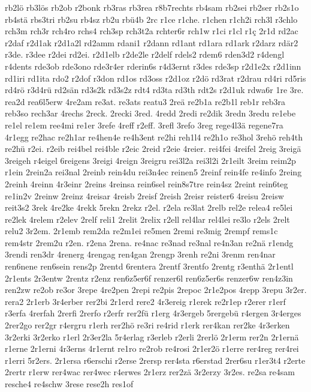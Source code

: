 {rb2lö
rb3lös
rb2ob
r2bonk
rb3ras
rb3rea
r8b7rechts
rb4sam
rb2sei
rb2ser
rb2s1o
rb4stä
rbs3tri
rb2su
rb4sz
rb2u
rbü4b
2rc
r1ce
r1che.
r1chen
r1ch2i
rch3l
r3chlo
rch3m
rch3r
rch4ro
rchs4
rch3sp
rch3t2a
rchter6r
rch1w
r1ci
r1cl
r1ç
2r1d
rd2ac
r2daf
r2d1ak
r2d1a2l
rd2amm
rdani1
r2dann
rd1ant
rd1ara
rd1ark
r2darz
rdär2
r3de.
r3dee
r2dei
rd2ei.
r2d1elb
r2de2le
r2delf
rdels2
rdem6
rden3d2
r4dengl
r4dents
rde3ob
rde3ono
rde3r4er
rderin6s
r4d3ernt
r3des
rde3sp
r2d1e2x
r2d1inn
rd1iri
rd1ita
rdo2
r2dof
r3don
rd1os
rd3oss
r2d1oz
r2dö
rd3rat
r2drau
rd4ri
rd5ris
rd4rö
r3d4rü
rd2sän
rd3s2k
rd3s2z
rdt4
rd3ta
rd3th
rdt2s
r2d1uk
rdwa6r
1re
3re.
rea2d
rea6l5erw
4re2am
re3at.
re3ats
reatu3
2reä
re2b1a
re2b1l
reb1r
reb3ra
reb3so
rech3ar
4rechs
2reck.
2recki
3red.
4redd
2redi
re2dik
3redn
3redu
re1ebe
re1el
re1em
ree4mi
re1er
3refe
4reff
r2eff.
3refl
3refo
3reg
rege4l3ä
regene7ra
4r1egg
re2hac
re2h1ar
re4hen4e
re4h3ent
re2hi
reh1l4
re2h1o
re3hol
3rehö
reh4th
re2hü
r2ei.
r2eib
rei4bel
rei4ble
r2eic
2reid
r2eie
4reier.
rei4fei
4reifel
2reig
3reigä
3reigeh
r4eigel
6reigens
3reigi
4reign
3reigru
rei3l2a
rei3l2i
2r1eilt
3reim
reim2p
r1ein
2rein2a
rei3nal
2reinb
rein4du
rei3n4ec
reinen5
2reinf
rein4fe
re4info
2reing
2reinh
4reinn
4r3einr
2reins
4reinsa
rein6sel
rein8s7tre
rein4sz
2reint
rein6teg
re1in2v
2reinw
2reinz
4reisar
4reisb
2reisf
2reish
2reisr
reister6
4reisu
2reisw
reit3s2
3rek
4re2ke
4rekk
5rekn
2rekz
r2el.
r2ela
re3lat
2relb
rel2e
relea4
re5lei
re2lek
4relem
r2elev
2relf
reli1
2relit
2relix
r2ell
rel4lar
rel4lei
re3lo
r2els
2relt
relu2
3r2em.
2r1emb
rem2da
re2m1ei
re5men
2remi
re3mig
2rempf
rems1c
rem4str
2rem2u
r2en.
r2ena
2rena.
re4nac
re3nad
re3nal
re4n3an
re2nä
r1endg
3rendi
ren3dr
4renerg
4rengag
ren4gan
2rengp
3renh
re2ni
3renm
ren4nar
ren6nene
ren6sein
rens2p
2rentd
6rentera
2rentf
3rentfo
2rentg
r3enthä
2r1entl
2r1ents
2r3entw
2rentz
r2enz
ren6z5er6f
renzer6l
ren6z5er6s
renzer6w
ren4z3in
ren2zw
re2ob
re3or
3repe
4re2pen
2repi
re2pis
2repoc
2r1e2pos
4repp
3repu
3r2er.
rera2
2r1erb
3r4erber
rer2bi
2r1erd
rere2
4r3ereig
r1erek
re2r1ep
r2erer
r1erf
r3erfa
4rerfah
2rerfi
2rerfo
r2erfr
rer2fü
r1erg
4r3ergeb
5rergebü
r4ergen
3r4erges
2rer2go
rer2gr
r4ergru
r1erh
rer2hö
re3ri
re4rid
r1erk
rer4kan
rer2ke
4r3erken
3r2erki
3r2erko
r1erl
2r3er2la
5r4erlag
r3erleb
r2erli
2rerlö
2r1erm
rer2n
2r1ernä
r1erne
2r1erni
4r3erns
4r1ernt
re1ro
re2rob
re4rosi
2r1er2ö
r1erre
rer4reg
rer4rei
r1erri
5r2ers.
2r1ersa
r6erschi
r2erse
2rersp
rer4sta
r6erstad
2rer6su
r1er3t4
r2erte
2rertr
r1erw
rer4wac
rer4wec
r4erwes
2r1erz
rer2zä
3r2erzy
3r2es.
re2sa
re4sam
resche4
re4schw
3rese
rese2h
res1of
}
